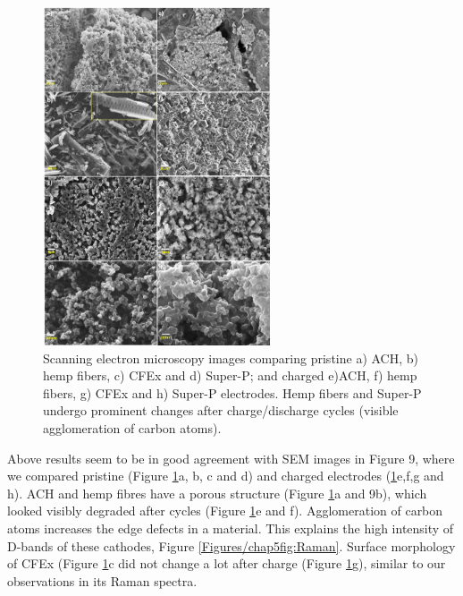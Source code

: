 \begin{figure}[tbh!]
  \centering
  \includegraphics[width=0.6\textwidth]{Figures/chap5fig/SEM}
    \caption{Scanning electron microscopy images comparing pristine a) ACH, b) hemp fibers, c) CFEx and d) Super-P; and charged e)ACH, f) hemp fibers, g) CFEx and h) Super-P electrodes. Hemp fibers and Super-P undergo prominent changes after charge/discharge cycles (visible agglomeration of carbon atoms).}
  \label{Figures/chap5fig:SEM}
\end{figure}
Above results seem to be in good agreement with SEM images in Figure 9, where we compared pristine (Figure \ref{Figures/chap5fig:SEM}a, b, c and d) and charged electrodes (\ref{Figures/chap5fig:SEM}e,f,g and h). ACH and hemp fibres have a porous structure (Figure \ref{Figures/chap5fig:SEM}a and 9b), which looked visibly degraded after cycles (Figure \ref{Figures/chap5fig:SEM}e and f). Agglomeration of carbon atoms increases the edge defects in a material. This explains the high intensity of D-bands of these cathodes, Figure \ref{Figures/chap5fig:Raman}. Surface morphology of CFEx (Figure \ref{Figures/chap5fig:SEM}c did not change a lot after charge (Figure \ref{Figures/chap5fig:SEM}g), similar to our observations in its Raman spectra. 
